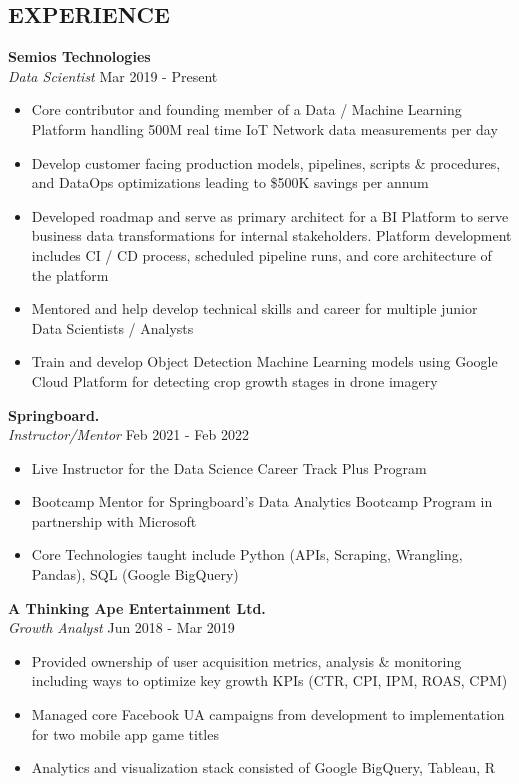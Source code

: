 \documentclass[margin]{res}
\begin{document}
\begin{resume}

\section{EXPERIENCE}

\textbf{Semios Technologies }
    \\ {\sl Data Scientist} \hfill{Mar 2019 - Present} 

\begin{itemize}
  \item Core contributor and founding member of a Data / Machine Learning Platform handling 500M real time IoT Network data measurements per day
  \item Develop customer facing production models, pipelines, scripts & procedures, and DataOps optimizations leading to \$500K savings per annum
  \item Developed roadmap and serve as primary architect for a BI Platform to serve business data transformations for internal stakeholders. Platform development includes CI / CD process, scheduled pipeline runs, and core architecture of the platform
  \item Mentored and help develop technical skills and career for multiple junior Data Scientists / Analysts
  \item Train and develop Object Detection Machine Learning models using Google Cloud Platform for detecting crop growth stages in drone imagery
\end{itemize}

\textbf{Springboard.} 
    \\ {\sl Instructor/Mentor} \hfill{Feb 2021 - Feb 2022}
\begin{itemize}
    \item Live Instructor for the Data Science Career Track Plus Program
    \item Bootcamp Mentor for Springboard's Data Analytics Bootcamp Program in partnership with Microsoft
    \item Core Technologies taught include Python (APIs, Scraping, Wrangling, Pandas), SQL (Google BigQuery)
\end{itemize}

\textbf{A Thinking Ape Entertainment Ltd.} 
    \\ {\sl Growth Analyst} \hfill{Jun 2018 - Mar 2019}
\begin{itemize}
  \item Provided ownership of user acquisition metrics, analysis \& monitoring including ways to optimize key growth KPIs (CTR, CPI, IPM, ROAS, CPM)
  \item Managed core Facebook UA campaigns from development to implementation for two mobile app game titles
  \item Analytics and visualization stack consisted of Google BigQuery, Tableau, R
\end{itemize}


\end{resume}
\end{document}
